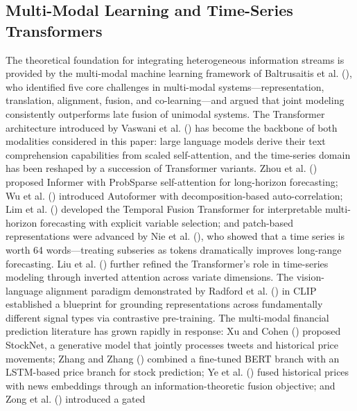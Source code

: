 \documentclass[
  11pt,
  a4paper,
]{article}
\begin{document}
\subsection{Multi-Modal Learning and Time-Series
Transformers}\label{multi-modal-learning-and-time-series-transformers}

The theoretical foundation for integrating heterogeneous information
streams is provided by the multi-modal machine learning framework of
Baltrusaitis et al. (), who
identified five core challenges in multi-modal systems---representation,
translation, alignment, fusion, and co-learning---and argued that joint
modeling consistently outperforms late fusion of unimodal systems. The
Transformer architecture introduced by Vaswani et al.
() has become the backbone of both
modalities considered in this paper: large language models derive their
text comprehension capabilities from scaled self-attention, and the
time-series domain has been reshaped by a succession of Transformer
variants. Zhou et al. () proposed Informer
with ProbSparse self-attention for long-horizon forecasting; Wu et al.
() introduced Autoformer with
decomposition-based auto-correlation; Lim et al.
() developed the Temporal Fusion Transformer
for interpretable multi-horizon forecasting with explicit variable
selection; and patch-based representations were advanced by Nie et al.
(), who showed that a time series is worth
64 words---treating subseries as tokens dramatically improves long-range
forecasting. Liu et al. () further refined
the Transformer's role in time-series modeling through inverted
attention across variate dimensions. The vision-language alignment
paradigm demonstrated by Radford et al.
() in CLIP established a blueprint for
grounding representations across fundamentally different signal types
via contrastive pre-training. The multi-modal financial prediction
literature has grown rapidly in response: Xu and Cohen
() proposed StockNet, a generative model that
jointly processes tweets and historical price movements; Zhang and Zhang
() combined a fine-tuned BERT branch
with an LSTM-based price branch for stock prediction; Ye et al.
() fused historical prices with news
embeddings through an information-theoretic fusion objective; and Zong
et al. () introduced a gated
\end{document}
